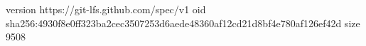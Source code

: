 version https://git-lfs.github.com/spec/v1
oid sha256:4930f8e0ff323ba2cec3507253d6aede48360af12cd21d8bf4e780af126ef42d
size 9508
